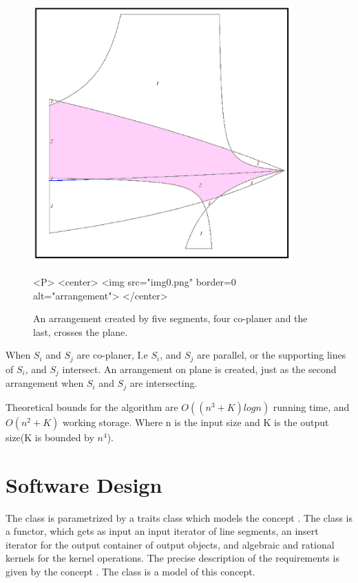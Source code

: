\begin{figure}
\begin{ccTexOnly}
\centerline{\includegraphics[width=10cm]{Lines_through_segments_3/img0}}
\end{ccTexOnly}
\label{fig:img0}
\begin{ccHtmlOnly}
<P>
<center>
  <img src="img0.png"  border=0 alt="arrangement">
</center>
\end{ccHtmlOnly}
\caption{An arrangement created by five segments, four co-planer and the last, crosses the plane.}
\end{figure}

When $S_i$ and $S_j$ are co-planer, I.e $S_i$, and $S_j$ are parallel, or the supporting lines of $S_i$, and $S_j$ intersect. An arrangement on plane is created, just as the second arrangement when $S_i$ and $S_j$ are intersecting. 

Theoretical bounds for the algorithm are $O((n^3 + K)log n)$ running time, and $O(n^2 + K)$ working storage. Where n is the input size and K is the output size(K is bounded by $n^4$).

\section{Software Design}
The class  is parametrized by a traits class which models the concept .\newline
The class is a functor, which gets as input an input iterator of line segments, an insert iterator for the output container of output objects, and algebraic and rational kernels for the kernel operations.
The precise description of the requirements is given by the concept . The class  is a model of this concept.


